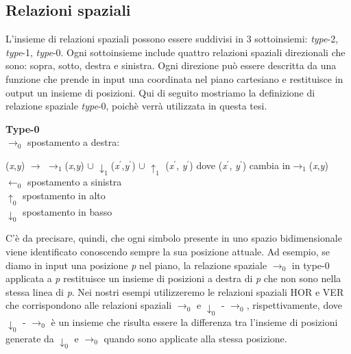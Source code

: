 \subsection{Relazioni spaziali}
L'insieme di relazioni spaziali \cite{pubblicazione: tomita} possono essere suddivisi in 3 sottoinsiemi: \textit{type}-2, \textit{type}-1, \textit{type}-0. Ogni sottoinsieme include quattro relazioni spaziali direzionali che sono: sopra, sotto, destra e sinistra. Ogni direzione può essere descritta da una funzione che prende in input una coordinata nel piano cartesiano e restituisce in output un insieme di posizioni. Qui di seguito mostriamo la definizione di relazione spaziale \textit{type}-0, poichè verrà utilizzata in questa tesi.
\begin{flushleft}
	\vspace{0.2cm}\noindent \textbf{Type-0}  \\
	$\to_0$  spostamento a destra: \par 
	(\textit{x},\textit{y}) $\to$   $\to_1$(\textit{x},\textit{y})  $\cup$ $\downarrow_1$(\textit{x}$^{'}$,\textit{y}$^{'}$) $\cup$ $\uparrow_1$ (\textit{x}$^{'}$, \textit{y}$^{'}$) dove (\textit{x}$^{'}$, \textit{y}$^{'}$) cambia in$\to_1$(\textit{x},\textit{y})\\
	$\gets_0$ spostamento  a sinistra \\
	$\uparrow_0$ spostamento in alto \\
	$\downarrow_0$ spostamento in basso 
\end{flushleft}
C'è da precisare, quindi, che ogni simbolo presente in uno spazio bidimensionale viene identificato conoscendo sempre la sua posizione attuale. Ad esempio, se diamo in input una posizione \textit{p} nel piano, la relazione spaziale $\to_0$ in type-0 applicata a \textit{p} restituisce un insieme di posizioni a destra di \textit{p} che non sono nella stessa linea di \textit{p}.
Nei nostri esempi utilizzeremo le relazioni spaziali HOR e VER che corrispondono alle relazioni spaziali $\to_0$ e $\downarrow_0$ - $\to_0$, rispettivamente, dove $\downarrow_0$ - $\to_0$ è un insieme che risulta essere la differenza tra l'insieme di posizioni generate da $\downarrow_0$ e $\to_0$ quando sono applicate alla stessa posizione. 
